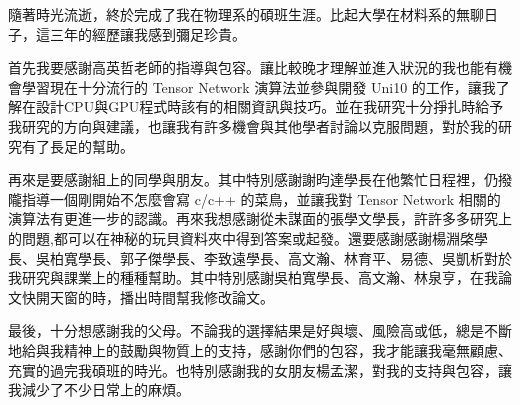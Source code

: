 \begin{acknowledgementszh}
隨著時光流逝，終於完成了我在物理系的碩班生涯。比起大學在材料系的無聊日子，這三年的經歷讓我感到彌足珍貴。

首先我要感謝高英哲老師的指導與包容。讓比較晚才理解並進入狀況的我也能有機會學習現在十分流行的 Tensor Network 演算法並參與開發 Uni10 的工作，讓我了解在設計CPU與GPU程式時該有的相關資訊與技巧。並在我研究十分掙扎時給予我研究的方向與建議，也讓我有許多機會與其他學者討論以克服問題，對於我的研究有了長足的幫助。

再來是要感謝組上的同學與朋友。其中特別感謝謝昀達學長在他繁忙日程裡，仍撥隴指導一個剛開始不怎麼會寫 c/c++ 的菜鳥，並讓我對 Tensor Network 相關的演算法有更進一步的認識。再來我想感謝從未謀面的張學文學長，許許多多研究上的問題,都可以在神秘的玩貝資料夾中得到答案或起發。還要感謝感謝楊淵棨學長、吳柏寬學長、郭子傑學長、李致遠學長、高文瀚、林育平、易德、吳凱析對於我研究與課業上的種種幫助。其中特別感謝吳柏寬學長、高文瀚、林泉亨，在我論文快開天窗的時，播出時間幫我修改論文。

最後，十分想感謝我的父母。不論我的選擇結果是好與壞、風險高或低，總是不斷地給與我精神上的鼓勵與物質上的支持，感謝你們的包容，我才能讓我毫無顧慮、充實的過完我碩班的時光。也特別感謝我的女朋友楊孟潔，對我的支持與包容，讓我減少了不少日常上的麻煩。
\end{acknowledgementszh}

